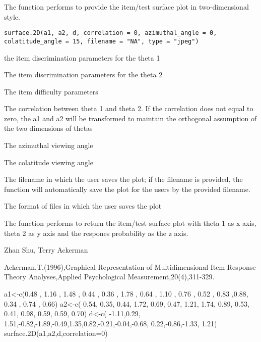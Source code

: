 \begin{Description}\relax
The function performs to provide the item/test surface plot in two-dimensional style.
\end{Description}
\begin{Usage}
\begin{verbatim}
surface.2D(a1, a2, d, correlation = 0, azimuthal_angle = 0, colatitude_angle = 15, filename = "NA", type = "jpeg")
\end{verbatim}
\end{Usage}
\begin{Arguments}
\begin{ldescription}
\item[\code{a1}] the item discrimination parameters for the theta 1  
\item[\code{a2}] The item discrimination parameters for the theta 2 
\item[\code{d}] The item difficulty parameters 
\item[\code{correlation}] The correlation between theta 1 and theta 2. If the correlation does not equal to zero, the a1 and a2 will be transformed to maintain the orthogonal assumption of the two dimensions of thetas 
\item[\code{azimuthal\_angle}] The azimuthal viewing angle 
\item[\code{colatitude\_angle}] The colatitude viewing angle 
\item[\code{filename}] The filename in which the user saves the plot; if the filename is provided, the function will automatically save the plot for the users by the provided filename. 
\item[\code{type}] The format of files in which the user saves the plot
\end{ldescription}
\end{Arguments}
\begin{Details}\relax
The function performs to return the item/test surface plot with theta 1 as x axis, theta 2 as y axis and the respones probability as the z axis.
\end{Details}
\begin{Author}\relax
Zhan Shu, Terry Ackerman
\end{Author}
\begin{References}\relax
Ackerman,T.(1996),Graphical Representation of Multidimensional Item Response Theory Analyses,Applied Psychological Measurement,20(4),311-329.
\end{References}
\begin{Examples}
\begin{ExampleCode}
a1<-c(0.48 , 1.16 , 1.48 , 0.44 , 0.36 , 1.78 , 0.64 , 1.10 , 0.76 , 0.52 , 0.83 ,0.88, 0.34 , 0.74 , 0.66)
a2<-c( 0.54, 0.35, 0.44, 1.72, 0.69, 0.47, 1.21, 1.74, 0.89, 0.53, 0.41, 0.98, 0.59, 0.59, 0.70)
d<-c( -1.11,0.29, 1.51,-0.82,-1.89,-0.49,1.35,0.82,-0.21,-0.04,-0.68, 0.22,-0.86,-1.33, 1.21)
surface.2D(a1,a2,d,correlation=0)
\end{ExampleCode}
\end{Examples}

